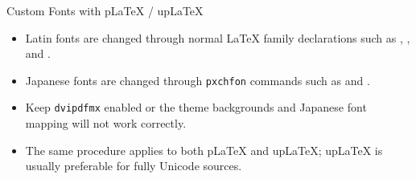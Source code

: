 \documentclass[10pt]{beamer}
\begin{document}
\begin{frame}{Custom Fonts with pLaTeX / upLaTeX}
  \begin{itemize}
    \item Latin fonts are changed through normal LaTeX family declarations such as \texttt{\string\rmdefault}, \texttt{\string\sfdefault}, and \texttt{\string\ttdefault}.
    \item Japanese fonts are changed through \texttt{pxchfon} commands such as \texttt{\string\setminchofont} and \texttt{\string\setgothicfont}.
    \item Keep \texttt{dvipdfmx} enabled or the theme backgrounds and Japanese font mapping will not work correctly.
    \item The same procedure applies to both pLaTeX and upLaTeX; upLaTeX is usually preferable for fully Unicode sources.
  \end{itemize}
\end{frame}
\end{document}
